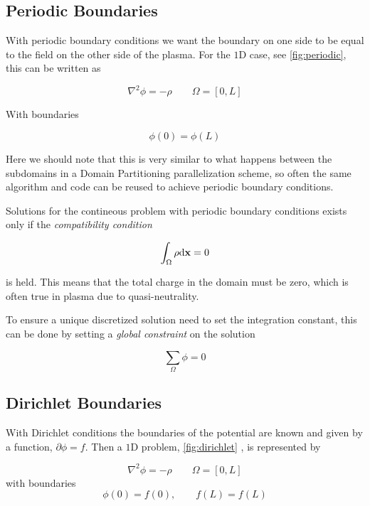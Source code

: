 \subsection{Periodic Boundaries}
	\label{sec:bnd_periodic}
	With periodic boundary conditions we want the boundary on one side to be equal
	to the field on the other side of the plasma. For the \(1\)D case, see \cref{fig:periodic},
	this can be written as

	\begin{equation}
		\nabla^2 \phi = -\rho \qquad \Omega = [0,L]
	\end{equation}

	With boundaries

	\begin{equation}
		\phi(0) = \phi(L)
	\end{equation}

	Here we should note that this is very similar to what happens between the subdomains
	in a Domain Partitioning parallelization scheme, so often the same algorithm and code
	can be reused to achieve periodic boundary conditions.

	Solutions for the contineous problem with periodic boundary conditions exists only if
	the \textit{compatibility condition} \citep{trottenberg_multigrid_2000}

	\begin{equation}
			\int_\Omega \rho\differential \vb{x} = 0
	\end{equation}

	is held. This means that the total charge in the domain must be zero, which
	is often true in plasma due to quasi-neutrality.

	To ensure a unique discretized solution need to set the integration constant, this can be done
	by setting a \textit{global constraint} on the solution

	\begin{equation}
		\sum_{\Omega} \phi = 0 \label{eq:global_constraint}
	\end{equation}

\subsection{Dirichlet Boundaries}
	With Dirichlet conditions the boundaries of the potential are known and given by a function,
	\(\partial \phi = f\). Then a \(1\)D problem, \cref{fig:dirichlet} , is represented by

	\begin{equation}
		\nabla^2 \phi = -\rho \qquad \Omega = [0,L]
	\end{equation}
	with boundaries
	\begin{equation}
		\phi(0) =  f(0), \qquad f(L) =   f(L)
	\end{equation}


